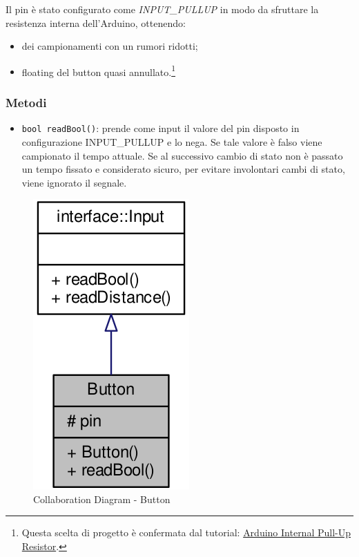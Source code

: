 Il pin è stato configurato come \textit{INPUT\_PULLUP} in modo da sfruttare la resistenza interna dell'Arduino, ottenendo:
\begin{itemize}
	\item dei campionamenti con un rumori ridotti;
	\item floating del button quasi annullato.\footnote{Questa scelta di progetto è confermata dal tutorial: \href{http://tinyurl.com/jqp8nwu}{Arduino Internal Pull-Up Resistor}.}
\end{itemize}

\subsubsection{Metodi}
\begin{itemize}
	\item \texttt{bool readBool()}: prende come input il valore del pin disposto in configurazione INPUT\_PULLUP e lo nega. Se tale valore è falso viene campionato il tempo attuale. Se al successivo cambio di stato non è passato un tempo fissato e considerato sicuro, per evitare involontari cambi di stato, viene ignorato il segnale.
\end{itemize}
\begin{figure}[!ht]
	\centering
	\includegraphics[scale=.35]{img/UML/CollaborationDiagram/Button.png}
	\caption{Collaboration Diagram - Button}
\end{figure}
